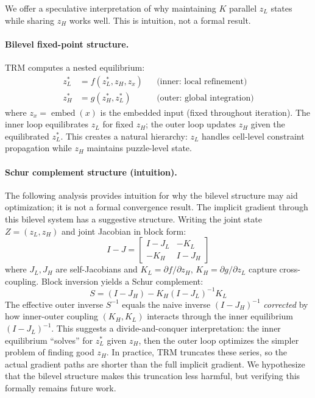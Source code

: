 We offer a speculative interpretation of why maintaining $K$ parallel $z_L$
states while sharing $z_H$ works well. This is intuition, not a formal result.

\paragraph{Bilevel fixed-point structure.} TRM computes a nested equilibrium:
%
\begin{align}
  z_L^* &= f(z_L^*, z_H, z_x) && \text{(inner: local refinement)} \\
  z_H^* &= g(z_H^*, z_L^*) && \text{(outer: global integration)}
\end{align}
%
where $z_x = \operatorname{embed}(x)$ is the embedded input (fixed throughout
iteration). The inner loop equilibrates $z_L$ for fixed $z_H$; the outer loop
updates $z_H$ given the equilibrated $z_L^*$. This creates a natural hierarchy:
$z_L$ handles cell-level constraint propagation while $z_H$ maintains
puzzle-level state.

\paragraph{Schur complement structure (intuition).} The following analysis
provides intuition for why the bilevel structure may aid optimization; it is
not a formal convergence result. The implicit gradient through this bilevel
system has a suggestive structure. Writing the joint state
$Z = (z_L, z_H)$ and joint Jacobian in block form:
%
\begin{equation}
  I - J = \begin{bmatrix} I - J_L & -K_L \\ -K_H & I - J_H \end{bmatrix}
\end{equation}
%
where $J_L, J_H$ are self-Jacobians and $K_L = \partial f/\partial z_H$,
$K_H = \partial g/\partial z_L$ capture cross-coupling. Block inversion yields
a Schur complement:
%
\begin{equation}
  S = (I - J_H) - K_H (I - J_L)^{-1} K_L
\end{equation}
%
The effective outer inverse $S^{-1}$ equals the naive inverse $(I-J_H)^{-1}$
\emph{corrected} by how inner-outer coupling $(K_H, K_L)$ interacts through
the inner equilibrium $(I-J_L)^{-1}$. This suggests a divide-and-conquer
interpretation: the inner equilibrium ``solves'' for $z_L^*$ given $z_H$,
then the outer loop optimizes the simpler problem of finding good $z_H$.
In practice, TRM truncates these series, so the actual gradient paths are
shorter than the full implicit gradient. We hypothesize that the bilevel
structure makes this truncation less harmful, but verifying this formally
remains future work.

